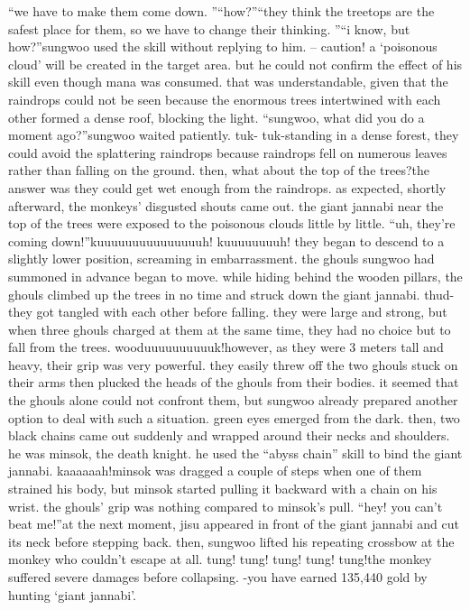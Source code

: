 “we have to make them come down.
”“how?”“they think the treetops are the safest place for them, so we have to change their thinking.
”“i know, but how?”sungwoo used the skill without replying to him.
– caution! a ‘poisonous cloud’ will be created in the target area.
but he could not confirm the effect of his skill even though mana was consumed.
that was understandable, given that the raindrops could not be seen because the enormous trees intertwined with each other formed a dense roof, blocking the light.
“sungwoo, what did you do a moment ago?”sungwoo waited patiently.
tuk- tuk-standing in a dense forest, they could avoid the splattering raindrops because raindrops fell on numerous leaves rather than falling on the ground.
 then, what about the top of the trees?the answer was they could get wet enough from the raindrops.
as expected, shortly afterward, the monkeys’ disgusted shouts came out.
the giant jannabi near the top of the trees were exposed to the poisonous clouds little by little.
“uh, they’re coming down!”kuuuuuuuuuuuuuuuh! kuuuuuuuuh!
they began to descend to a slightly lower position, screaming in embarrassment.
the ghouls sungwoo had summoned in advance began to move.
while hiding behind the wooden pillars, the ghouls climbed up the trees in no time and struck down the giant jannabi.
thud-they got tangled with each other before falling.
 they were large and strong, but when three ghouls charged at them at the same time, they had no choice but to fall from the trees.
wooduuuuuuuuuuk!however, as they were 3 meters tall and heavy, their grip was very powerful.
they easily threw off the two ghouls stuck on their arms then plucked the heads of the ghouls from their bodies.
it seemed that the ghouls alone could not confront them, but sungwoo already prepared another option to deal with such a situation.
green eyes emerged from the dark.
then, two black chains came out suddenly and wrapped around their necks and shoulders.
he was minsok, the death knight.
 he used the “abyss chain” skill to bind the giant jannabi.
kaaaaaah!minsok was dragged a couple of steps when one of them strained his body, but minsok started pulling it backward with a chain on his wrist.
 the ghouls’ grip was nothing compared to minsok’s pull.
“hey! you can’t beat me!”at the next moment, jisu appeared in front of the giant jannabi and cut its neck before stepping back.
 then, sungwoo lifted his repeating crossbow at the monkey who couldn’t escape at all.
tung! tung! tung! tung! tung!the monkey suffered severe damages before collapsing.
-you have earned 135,440 gold by hunting ‘giant jannabi’.
